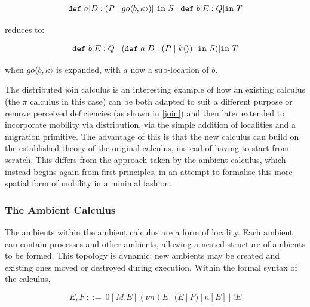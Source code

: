 \begin{equation}
\mathtt{def}\ a[D:(P \;|\; go \langle b, \kappa \rangle)]\ \mathtt{in}\ S
\;|\; \mathtt{def}\ b[E : Q] \mathtt{in}\ T
\end{equation}

\noindent reduces to:

\begin{equation}
\mathtt{def}\ b[E : Q \pc (\mathtt{def}\ a[D:(P \pc k\langle \rangle)]\ \mathtt{in}\ S)] \mathtt{in}\ T
\end{equation}

\noindent when $go \langle b, \kappa \rangle$ is expanded, with $a$
now a sub-location of $b$.

The distributed join calculus is an interesting example of how an
existing calculus (the $\pi$ calculus in this case) can be both
adapted to suit a different purpose or remove perceived deficiencies
(as shown in \ref{join}) and then later extended to incorporate
mobility via distribution, via the simple addition of localities and a
migration primitive.  The advantage of this is that the new calculus
can build on the established theory of the original calculus, instead
of having to start from scratch.  This differs from the approach taken
by the ambient calculus, which instead begins again from first
principles, in an attempt to formalise this more spatial form of
mobility in a minimal fashion.



\subsubsection{The Ambient Calculus}
\label{ambientcalculus}

The ambients within the ambient calculus \cite{amb} are a form of
locality.  Each ambient can contain processes and other ambients,
allowing a nested structure of ambients to be formed.  This topology
is dynamic; new ambients may be created and existing ones moved or
destroyed during execution.  Within the formal syntax of the calculus,

\begin{equation}
\label{ambsyntax}
  E, F\ ::=\ 
  0\ |\ 
  M.E\ |\ 
  (\nu n)E\ |\ 
  (E\ |\ F)\ |\ 
  n[E]\ |\ 
  !E
\end{equation}

